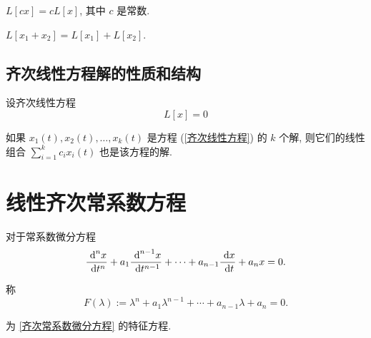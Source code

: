 \begin{property}
	$L[cx]=cL[x]$, 其中 $c$ 是常数.
\end{property}

\begin{property}
	$L[x_1+x_2] = L[x_1]+L[x_2]$.
\end{property}

\subsection{齐次线性方程解的性质和结构}

设齐次线性方程
\begin{equation}\label{齐次线性方程}
 	L[x] = 0
\end{equation}

\begin{theorem}[叠加原理]
	如果 $x_1(t),x_2(t),\ldots,x_k(t)$ 是方程 (\ref{齐次线性方程}) 的 $k$ 个解, 则它们的线性组合 $\sum\limits_{i=1}^k c_ix_i(t)$ 也是该方程的解.
\end{theorem}


\section{线性齐次常系数方程}

对于常系数微分方程
\begin{equation}\label{齐次常系数微分方程}
	 \frac{\ \text {d}^n x}{\ \text {d} t^n}+a_1\frac{\ \text {d}^{n-1}x}{\ \text {d} t^{n-1}}+\cdots+a_{n-1}\frac{\ \text {d} x}{\ \text {d} t}+a_nx=0.
\end{equation}

称\begin{equation}
	F(\lambda):=\lambda^n+a_1\lambda^{n-1}+\cdots+a_{n-1}\lambda+a_n = 0.
\end{equation}

为 \eqref{齐次常系数微分方程} 的特征方程.
